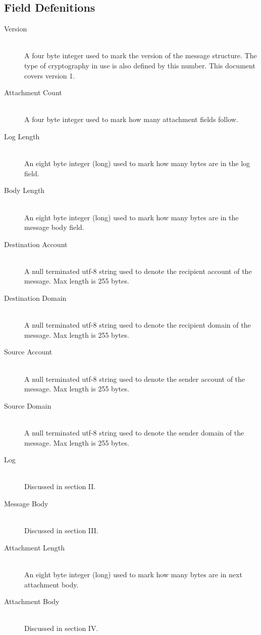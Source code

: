 \documentclass[a4paper,11pt]{article}
\begin{document}
\subsection{Field Defenitions}
\begin{description}
  \item[Version] \hfill \\ A four byte integer used to mark the version of the message structure. The type of cryptography in use is also defined by this number. This document covers version 1.
  \item[Attachment Count] \hfill \\ A four byte integer used to mark how many attachment fields follow.
  \item[Log Length] \hfill \\ An eight byte integer (long) used to mark how many bytes are in the log field.
  \item[Body Length] \hfill \\  An eight byte integer (long) used to mark how many bytes are in the message body field.
  \item[Destination Account] \hfill \\ A null terminated utf-8 string used to denote the recipient account of the message. Max length is 255 bytes.
  \item[Destination Domain] \hfill \\ A null terminated utf-8 string used to denote the recipient domain of the message. Max length is 255 bytes.
  \item[Source Account] \hfill \\ A null terminated utf-8 string used to denote the sender account of the message. Max length is 255 bytes.
  \item[Source Domain] \hfill \\ A null terminated utf-8 string used to denote the sender domain of the message. Max length is 255 bytes.
  \item[Log] \hfill \\ Discussed in section II.
  \item[Message Body] \hfill \\ Discussed in section III.
  \item[Attachment Length] \hfill \\ An eight byte integer (long) used to mark how many bytes are in next attachment body.
  \item[Attachment Body] \hfill \\ Discussed in section IV.
  
\end{description}
\end{document}
